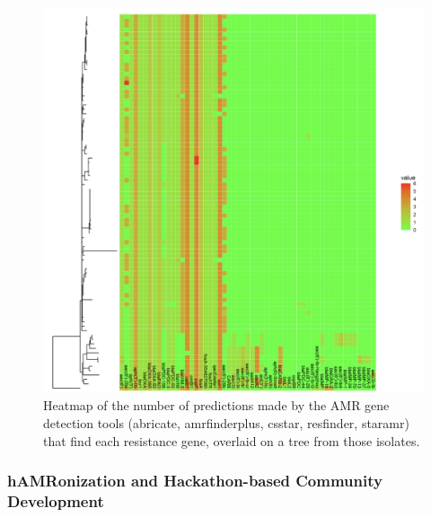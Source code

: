 \begin{figure}[]
\centering
\includegraphics[width=\textwidth]{figures/chapter 6/Fig 3.png}
\caption{Heatmap of the number of predictions made by the AMR gene detection tools (abricate, amrfinderplus, csstar, resfinder, staramr) that find each resistance gene, overlaid on a tree from those isolates.}
\label{fig:chap6_figure3}
\end{figure}

\subsubsection{hAMRonization and Hackathon-based Community Development}

